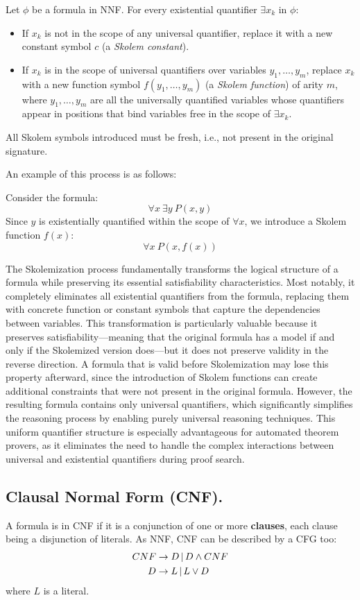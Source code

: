 Let \(\phi\) be a formula in NNF\@. For every existential quantifier \(\exists x_k\) in \(\phi\):
\begin{itemize}
  \item If \(x_k\) is not in the scope of any universal quantifier, replace it with a new constant symbol \(c\) (a \emph{Skolem constant}).
  \item If \(x_k\) is in the scope of universal quantifiers over variables \(y_1, \dots, y_m\), replace \(x_k\) with a new function symbol \(f(y_1, \dots, y_m)\) (a \emph{Skolem function}) of arity \(m\), where \(y_1, \dots, y_m\) are all the universally quantified variables whose quantifiers appear in positions that bind variables free in the scope of \(\exists x_k\).
\end{itemize}
All Skolem symbols introduced must be fresh, i.e., not present in the original signature.


An example of this process is as follows:

Consider the formula:
\[
\forall x \: \exists y \: P(x, y)
\]
Since \(y\) is existentially quantified within the scope of \(\forall x\), we introduce a Skolem function \(f(x)\):
\[
\forall x \: P(x, f(x))
\]

The Skolemization process fundamentally transforms the logical structure of a formula while preserving its essential satisfiability characteristics.
Most notably, it completely eliminates all existential quantifiers from the formula, replacing them with concrete function or constant symbols that capture the dependencies between variables.
This transformation is particularly valuable because it preserves satisfiability—meaning that the original formula has a model if and only if the Skolemized version does—but it does not preserve validity in the reverse direction.
A formula that is valid before Skolemization may lose this property afterward, since the introduction of Skolem functions can create additional constraints that were not present in the original formula.
However, the resulting formula contains only universal quantifiers, which significantly simplifies the reasoning process by enabling purely universal reasoning techniques. 
This uniform quantifier structure is especially advantageous for automated theorem provers, as it eliminates the need to handle the complex interactions between universal and existential quantifiers during proof search.

\subsection{Clausal Normal Form (CNF).}
A formula is in CNF if it is a conjunction of one or more \textbf{clauses}, each clause being a disjunction of literals.  
As NNF, CNF can be described by a CFG too:
\begin{equation}
  \begin{aligned}
    CNF &\to D  \, | \,  D \land CNF \\
      D &\to L  \, | \,  L \lor D
  \end{aligned}
\end{equation}
where \(L\) is a literal.

